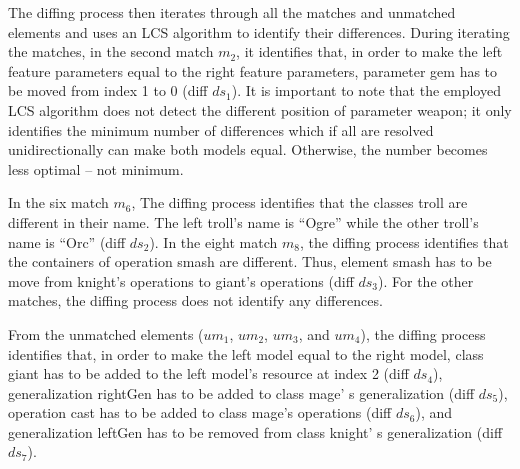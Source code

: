 The diffing process then iterates through all the matches and unmatched elements and uses an LCS algorithm to identify their differences. During iterating the matches, in the second match $m_2$, it identifies that, in order to make the left feature \textsf{parameters} equal to the right feature \textsf{parameters}, parameter \textsf{gem} has to be moved from index 1 to 0 (diff $ds_1$). It is important to note that the employed LCS algorithm does not detect the different position of parameter \textsf{weapon}; it only identifies the minimum number of differences which if all are resolved unidirectionally can make both models equal. Otherwise, the number becomes less optimal -- not minimum.

In the six match $m_6$, The diffing process identifies that the classes \textsf{troll} are different in their \textsf{name}. The left \textsf{troll}'s \textsf{name} is ``Ogre'' while the other \textsf{troll}'s \textsf{name} is ``Orc'' (diff $ds_2$). In the eight match $m_8$, the diffing process identifies that the containers of operation \textsf{smash} are different. Thus, element \textsf{smash} has to be move from \textsf{knight}'s \textsf{operations} to \textsf{giant}'s \textsf{operations} (diff $ds_3$). For the other matches, the diffing process does not identify any differences. 

From the unmatched elements ($um_1$, $um_2$, $um_3$, and $um_4$), the diffing process identifies that, in order to make the left model equal to the right model, class \textsf{giant} has to be added to the left model's resource at index 2 (diff $ds_4$), generalization \textsf{rightGen} has to be added to class \textsf{mage}' s \textsf{generalization} (diff $ds_5$), operation \textsf{cast} has to be added to class \textsf{mage}'s \textsf{operations} (diff $ds_6$), and  generalization \textsf{leftGen} has to be removed from class \textsf{knight}' s \textsf{generalization} (diff $ds_7$).

